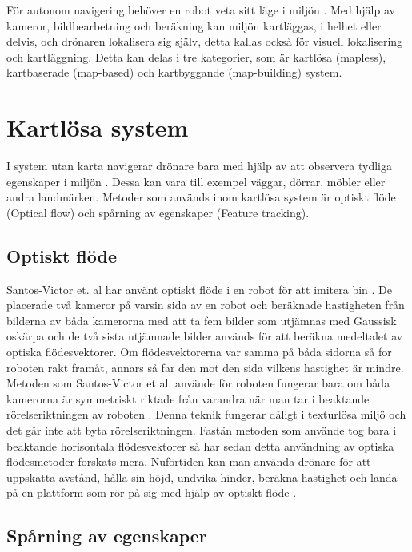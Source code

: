 För autonom navigering behöver en robot veta sitt läge i miljön \citep{geospatial}. Med hjälp av kameror, bildbearbetning och beräkning kan miljön kartläggas, i helhet eller delvis, och drönaren lokalisera sig själv, detta kallas också för visuell lokalisering och kartläggning. Detta kan delas i tre kategorier, som är kartlösa (mapless), kartbaserade (map-based) och kartbyggande (map-building) system. 

\section{Kartlösa system}

I system utan karta navigerar drönare bara med hjälp av att observera tydliga egenskaper i miljön \citep{982903}. Dessa kan vara till exempel väggar, dörrar, möbler eller andra landmärken. Metoder som används inom kartlösa system är optiskt flöde (Optical flow) och spårning av egenskaper (Feature tracking). 

\subsection{Optiskt flöde}

Santos-Victor et. al har använt optiskt flöde i en robot för att imitera bin \citep{341094}. De placerade två kameror på varsin sida av en robot och beräknade hastigheten från bilderna av båda kamerorna med att ta fem bilder som utjämnas med Gaussisk oskärpa och de två sista utjämnade bilder används för att beräkna medeltalet av optiska flödesvektorer. Om flödesvektorerna var samma på båda sidorna så for roboten rakt framåt, annars så far den mot den sida vilkens hastighet är mindre. Metoden som Santos-Victor et al. använde för roboten fungerar bara om båda kamerorna är symmetriskt riktade från varandra när man tar i beaktande rörelseriktningen av roboten \citep{982903}. Denna teknik fungerar dåligt i texturlösa miljö och det går inte att byta rörelseriktningen. Fastän metoden som \cite{341094} använde tog bara i beaktande horisontala flödesvektorer så har sedan detta användning av optiska flödesmetoder forskats mera. Nuförtiden kan man använda drönare för att uppskatta avstånd, hålla sin höjd, undvika hinder, beräkna hastighet och landa på en plattform som rör på sig med hjälp av optiskt flöde \citep{6564752}.

\subsection{Spårning av egenskaper}

